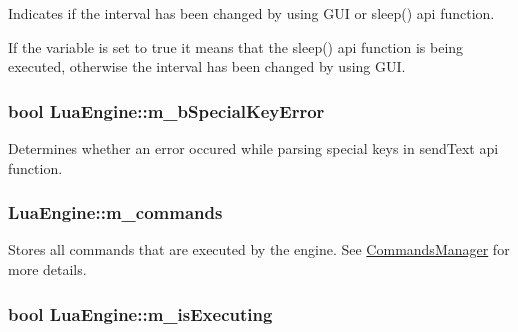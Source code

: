 Indicates if the interval has been changed by using G\-U\-I or sleep() api function. 

If the variable is set to true it means that the sleep() api function is being executed, otherwise the interval has been changed by using G\-U\-I. \hypertarget{class_lua_engine_a5cac380e1359eb5a6cf95239e4ad2b19}{
\subsubsection[{m\-\_\-b\-Special\-Key\-Error}]{\setlength{\rightskip}{0pt plus 5cm}bool Lua\-Engine\-::m\-\_\-b\-Special\-Key\-Error\hspace{0.3cm}{\ttfamily [private]}}}\label{class_lua_engine_a5cac380e1359eb5a6cf95239e4ad2b19}


Determines whether an error occured while parsing special keys in send\-Text api function. 

\hypertarget{class_lua_engine_a86a3f32127e36e1ccce6c5a42a298ad5}{
\subsubsection[{m\-\_\-commands}]{ Lua\-Engine\-::m\-\_\-commands\hspace{0.3cm}{\ttfamily [private]}}}\label{class_lua_engine_a86a3f32127e36e1ccce6c5a42a298ad5}


Stores all commands that are executed by the engine. See \hyperlink{class_commands_manager}{Commands\-Manager} for more details. 

\hypertarget{class_lua_engine_ad2bf267f4030d958e5a6f88a3a19e039}{
\subsubsection[{m\-\_\-is\-Executing}]{\setlength{\rightskip}{0pt plus 5cm}bool Lua\-Engine\-::m\-\_\-is\-Executing\hspace{0.3cm}{\ttfamily [private]}}}\label{class_lua_engine_ad2bf267f4030d958e5a6f88a3a19e039}


